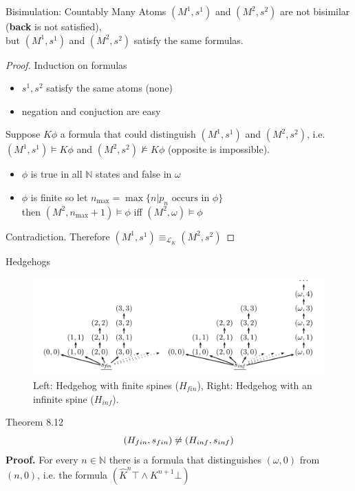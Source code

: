\documentclass{beamer}
\newcommand{\lang}{\mathcal{L}}
\begin{document}
\begin{frame}{Bisimulation: Countably Many Atoms}
	$(M^1,s^1)$ and $(M^2,s^2)$ are not bisimilar (\textbf{back} is not satisfied),\\
	but $(M^1,s^1)$ and $(M^2,s^2)$ satisfy the same formulas. \pause
	\begin{proof}
		Induction on formulas
		\begin{itemize}
			\item $s^1,s^2$ satisfy the same atoms (none)
			\item negation and conjuction are easy
		\end{itemize} \pause
		Suppose $K\phi$ a formula that could distinguish $(M^1,s^1)$ and $(M^2,s^2)$, i.e. $(M^1,s^1) \models K\phi$ and $(M^2,s^2) \not\models K\phi$ (opposite is impossible).
		\begin{itemize}
			\item $\phi$ is true in all $\mathbb{N}$ states and false in $\omega$
			\item $\phi$ is finite so let $n_{\max} = \max \{n|p_n \text{ occurs in } \phi\}$\\
				then $(M^2,n_{\max}+1) \models \phi$ iff $(M^2,\omega) \models \phi$
		\end{itemize} \pause
		Contradiction. Therefore $(M^1,s^1) \equiv_{\lang_K} (M^2,s^2)$
	\end{proof}
\end{frame}

\begin{frame}{Hedgehogs}
	\begin{figure}[h]
		\includegraphics[width=1\textwidth]{figure_8_1_hedgehog_models}
		\caption{Left: Hedgehog with finite spines ($H_{fin}$), Right: Hedgehog with an infinite spine ($H_{inf}$).}
	\end{figure} \pause
	\begin{block}{Theorem 8.12}
		\[(H_{fin},s_{fin}) \not\leftrightarroweq (H_{inf},s_{inf})\] \pause
		\textbf{Proof.} For every $n \in \mathbb{N}$  there is a formula that distinguishes $(\omega,0)$ from $(n,0)$, i.e. the formula $(\hat{K}^n \top \wedge K^{n+1} \bot)$
	\end{block}
\end{frame}
\end{document}
